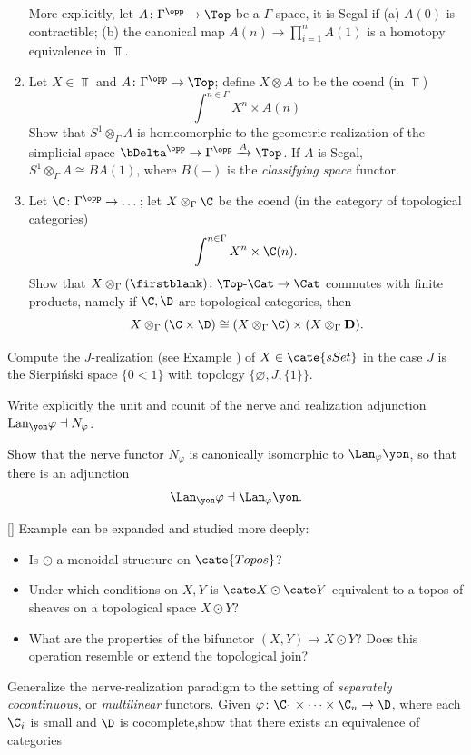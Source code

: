 \begin{exerciseset}
\begin{exercisepoints}
\begin{enumerate}
More explicitly, let $A\colon \Gamma^\opp\to \Top$ be a $\Gamma$-space, it is Segal if (a) $A(0)$ is contractible; (b) the canonical map $A(n)\to \prod_{i=1}^n A(1)$ is a homotopy equivalence in $\Top$.
\item Let $X\in\Top$ and $A\colon \Gamma^\opp\to \Top$; define $X\otimes A$ to be the coend (in $\Top$)
\[
\int^{n\in\Gamma} X^n\times A(n)
\] 
Show that $S^1\otimes_\Gamma A$ is homeomorphic to the geometric realization of the simplicial space $\bDelta^\opp\to \Gamma^\opp\xrightarrow{A}\Top$. If $A$ is Segal, $S^1\otimes_\Gamma A\cong BA(1)$, where $B(-)$ is the \emph{classifying space} functor.
\item Let $\C\colon \Gamma^\opp\to\dots$; let $X\otimes_\Gamma \C$ be the coend (in the category of topological categories)
\[
\int^{n\in\Gamma} X^n\times \C(n).
\]
Show that $X\otimes_\Gamma (\firstblank) \colon {\Top}\text{-}\Cat\to \Cat$ commutes with finite products, namely if $\C, \D$ are topological categories, then 
\[
X\otimes_\Gamma({\C\times \D})\cong (X\otimes_\Gamma\C)\times (X\otimes_\Gamma {\bf D}).
\]
\end{enumerate}
\item Compute the $J$-realization (see Example ) of $X\in \cate{sSet}$ in the case $J$ is the Sierpi\'nski space $\{0 < 1\}$ with topology $\{\varnothing, J, \{1\}\}$.
\item \label{unit-and-counit} Write explicitly the unit and counit of the nerve and realization adjunction $\text{Lan}_\yon \varphi \dashv N_\varphi$.
\item Show that the nerve functor $N_\varphi$ is canonically isomorphic to $\Lan_\varphi\yon$, so that there is an adjunction
\[
\Lan_\yon\varphi \dashv \Lan_\varphi\yon.
\]
\item \label{ex:toposofic} [\awful] Example  can be expanded and studied more deeply:
\begin{itemize}
\item Is $\odot$ a monoidal structure on $\cate{Topos}$?
\item Under which conditions on $X,Y$ is $\cate X \odot \cate Y$ equivalent to a topos of sheaves on a topological space $X \odot Y$? 
\item What are the properties of the bifunctor $(X,Y)\mapsto X \odot Y$? Does this operation resemble or extend the topological join?
\end{itemize}
\item Generalize the nerve-realization paradigm to the setting of \emph{separately cocontinuous}, or \emph{multilinear} functors. Given $\varphi \colon \C_1 \times \dots \times \C_n \to \D$, where each $\C_i$ is small and $\D$ is cocomplete,show that there exists an equivalence of categories

\end{exercisepoints}
\end{exerciseset}
